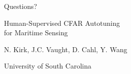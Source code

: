 \documentclass[aspectratio=169, 10pt]{beamer}
\begin{document}
{
\begin{frame}[plain]
    \vspace{2.5cm}
    \begin{center}
        {\color{white}\Huge Questions?}

        \vspace{1.5cm}
        {\color{Black10}\Large Human-Supervised CFAR Autotuning\\for Maritime Sensing}

        \vspace{1cm}
        {\color{Black10}\large N. Kirk, J.C. Vaught, D. Cahl, Y. Wang}

        \vspace{0.5cm}
        {\color{Black10}University of South Carolina}
    \end{center}
\end{frame}
}
\end{document}
